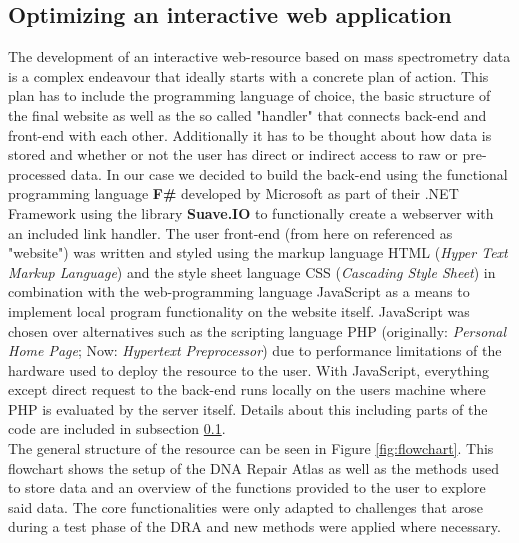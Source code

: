 \subsection{Optimizing an interactive web application}
\label{sec:resource}
The development of an interactive web-resource based on mass spectrometry data is a complex endeavour that ideally starts with a concrete plan of action. This plan has to include the programming language of choice, the basic structure of the final website as well as the so called "handler" that connects back-end and front-end with each other. Additionally it has to be thought about how data is stored and whether or not the user has direct or indirect access to raw or pre-processed data. In our case we decided to build the back-end using the functional programming language \textbf{F\#} developed by Microsoft as part of their .NET Framework using the library \textbf{Suave.IO} to functionally create a webserver with an included link handler. The user front-end (from here on referenced as "website") was written and styled using the markup language HTML (\textit{Hyper Text Markup Language}) and the style sheet language CSS (\textit{Cascading Style Sheet}) in combination with the web-programming language JavaScript as a means to implement local program functionality on the website itself. JavaScript was chosen over alternatives such as the scripting language PHP (originally: \textit{Personal Home Page}; Now: \textit{Hypertext Preprocessor}) due to performance limitations of the hardware used to deploy the resource to the user. With JavaScript, everything except direct request to the back-end runs locally on the users machine where PHP is evaluated by the server itself. Details about this including parts of the code are included in subsection \ref{sec:resource}.\\

The general structure of the resource can be seen in Figure \ref{fig:flowchart}. This flowchart shows the setup of the DNA Repair Atlas as well as the methods used to store data and an overview of the functions provided to the user to explore said data. The core functionalities were only adapted to challenges that arose during a test phase of the DRA and new methods were applied where necessary.\\

